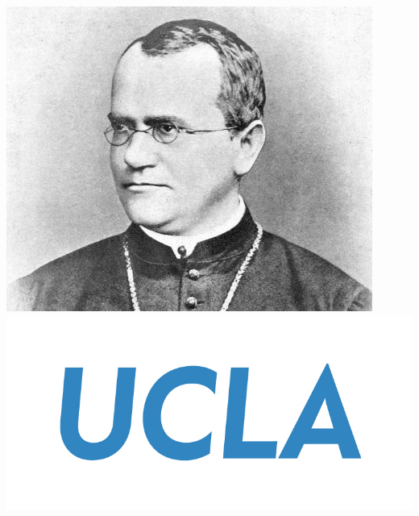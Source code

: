 \documentclass[a0,portrait]{a0poster}
\begin{document}
\begin{minipage}[b]{0.25\linewidth}
\centering
\includegraphics[width=12cm]{figures/gregor-mendel-3.jpg}
\includegraphics[width=15cm]{figures/ucla-std-blu-cmyk.jpg}
\end{minipage}


\end{document}
